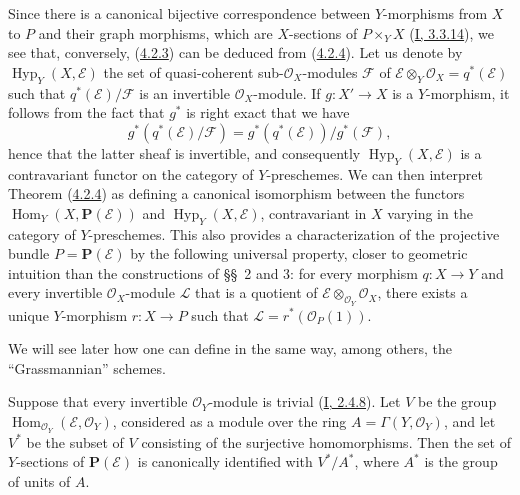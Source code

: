 \begin{remark}[4.2.5]
\label{II.4.2.5}
Since there is a canonical bijective correspondence between $Y$-morphisms from $X$
to $P$ and their graph morphisms, which are $X$-sections of $P\times_YX$
(\hyperref[I.3.3.14]{I, 3.3.14}), we see that, conversely,
(\hyperref[II.4.2.3]{4.2.3}) can be deduced from
(\hyperref[II.4.2.4]{4.2.4}). Let us denote by
$\operatorname{Hyp}_Y(X,\mathcal{E})$ the set of quasi-coherent
sub-$\mathcal{O}_X$-modules $\mathcal{F}$ of
$\mathcal{E}\otimes_Y\mathcal{O}_X=q^*(\mathcal{E})$ such that
$q^*(\mathcal{E})/\mathcal{F}$ is an invertible $\mathcal{O}_X$-module. If
$g:X'\to X$ is a $Y$-morphism, it follows from the fact that $g^*$ is right
exact that we have
\[
  g^*(q^*(\mathcal{E})/\mathcal{F})=
  g^*(q^*(\mathcal{E}))/g^*(\mathcal{F}),
\]
hence that the latter sheaf is invertible, and consequently
$\operatorname{Hyp}_Y(X,\mathcal{E})$ is a contravariant functor on the
category of $Y$-preschemes. We can then interpret Theorem
(\hyperref[II.4.2.4]{4.2.4}) as defining a canonical isomorphism
between the functors $\operatorname{Hom}_Y(X,\mathbf{P}(\mathcal{E}))$ and
$\operatorname{Hyp}_Y(X,\mathcal{E})$, contravariant in $X$ varying in the
category of $Y$-preschemes. This also provides a characterization of the
projective bundle $P=\mathbf{P}(\mathcal{E})$ by the following universal property,
closer to geometric intuition than the constructions of \S\S~2 and
3: for every morphism $q:X\to Y$ and every invertible $\mathcal{O}_X$-module
$\mathcal{L}$ that is a quotient of $\mathcal{E}\otimes_{\mathcal{O}_Y}\mathcal{O}_X$,
there exists a unique $Y$-morphism $r:X\to P$ such that
$\mathcal{L}=r^*(\mathcal{O}_P(1))$.

We will see later how one can define in the same way, among others,
the ``Grassmannian'' schemes.
\end{remark}

\begin{corollary}[4.2.6]
\label{II.4.2.6}
Suppose that every invertible $\mathcal{O}_Y$-module is trivial
(\hyperref[I.2.4.8]{I, 2.4.8}). Let $V$ be the group
$\operatorname{Hom}_{\mathcal{O}_Y}(\mathcal{E},\mathcal{O}_Y)$, considered
as a module over the ring $A=\Gamma(Y,\mathcal{O}_Y)$, and let $V^*$ be the
subset of $V$ consisting of the surjective homomorphisms. Then the set
of $Y$-sections of $\mathbf{P}(\mathcal{E})$ is canonically identified with
$V^*/A^*$, where $A^*$ is the group of units of $A$.
\end{corollary}


